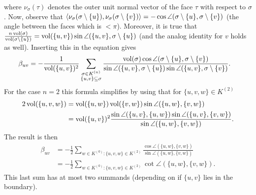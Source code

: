 \message{ !name(NUMFEM.tex)}\documentclass[8pt,a4paper]{article}
\begin{document}
where $\nu_{\sigma}(\tau)$ denotes the outer unit normal vector of the face $\tau$ with respect to $\sigma$.
Now, observe that $\left\langle \nu_{\sigma}(\sigma\setminus\{u\}),\nu_{\sigma}(\sigma\setminus\{v\}) \right\rangle=-\cos{\angle(\sigma\setminus\{u\},\sigma\setminus\{v\})}$ (the angle between the faces which is $<\pi$). Moreover, it is true that $\frac{n\operatorname{vol}(\sigma)}{\operatorname{vol}(\sigma\setminus\{u\})}=\operatorname{vol}(\{u,v\})\sin{\angle(\{u,v\},\sigma\setminus\{u\})}$ (and the analog identity for $v$ holds as well). Inserting this in the equation gives
\begin{align}
\beta_{uv} &= -\frac{1}{\operatorname{vol}(\{u,v\})^2}\sum_{\substack{\sigma\in K^{(n)}\\ \{u,v\}\subseteq \sigma}}{\frac{\operatorname{vol}(\sigma)\cos{\angle(\sigma\setminus\{u\},\sigma\setminus\{v\})}}{\sin{\angle(\{u,v\},\sigma\setminus\{u\})}\sin{\angle(\{u,v\},\sigma\setminus\{v\})}}}\text{.}
\end{align}
For the case $n=2$ this formula simplifies by using that for $\{u,v,w\}\in K^{(2)}$
\begin{align}
2\operatorname{vol}(\{u,v,w\}) &= \operatorname{vol}(\{u,w\})\operatorname{vol}(\{v,w\})\sin{\angle(\{u,w\},\{v,w\})}\\
 &= \operatorname{vol}(\{u,v\})^2\frac{\sin{\angle(\{u,v\},\{u,w\})}\sin{\angle(\{u,v\},\{v,w\})}}{\sin{\angle(\{u,w\},\{v,w\})}}.
\end{align}
The result is then
\begin{align}
\beta_{uv} &= -\frac{1}{2}\sum_{w\in K^{(0)}:\{u,v,w\}\in K^{(2)}}{\frac{\cos{\angle(\{u,w\},\{v,w\})}}{\sin{\angle(\{u,w\},\{v,w\})}}}\\
&= -\frac{1}{2}\sum_{w\in K^{(0)}:\{u,v,w\}\in K^{(2)}}{\cot{\angle(\{u,w\},\{v,w\})}}\text{.}
\end{align}
This last sum has at most two summands (depending on if $\{u,v\}$ lies in the boundary).
\end{document}
